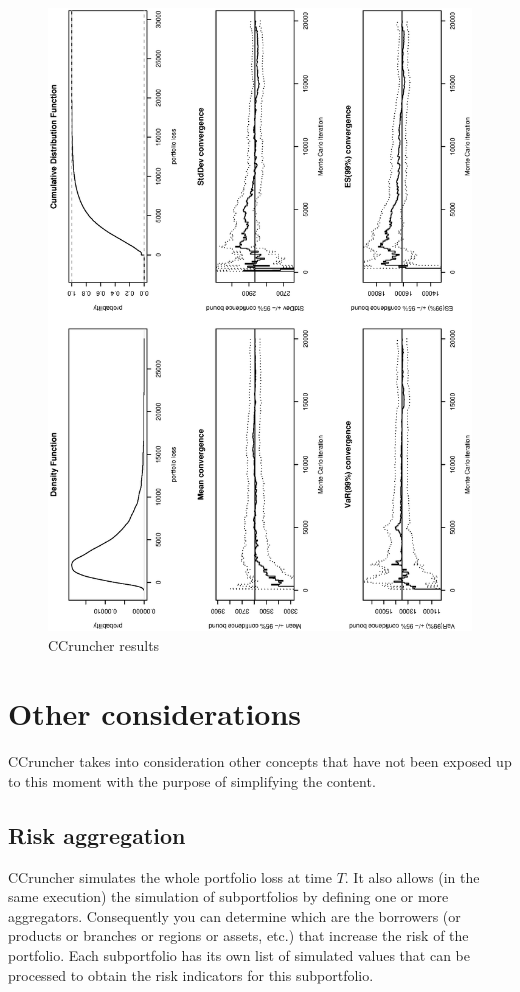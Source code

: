 \documentclass[a4paper,12pt,final]{article}
\begin{document}
\begin{figure}[p]
\begin{center}
\includegraphics[width=12cm,angle=0]{./images/report.eps}
\caption{CCruncher results}
\label{report}
\end{center}
\end{figure}


\clearpage
\section{Other considerations}
CCruncher takes into consideration other concepts that have not been exposed 
up to this moment with the purpose of simplifying the content.

\subsection{Risk aggregation}
CCruncher simulates the whole portfolio loss at time $T$. It also allows (in 
the same execution) the simulation of subportfolios by defining one or more 
aggregators. Consequently you can determine which are the borrowers (or products 
or branches or regions or assets, etc.) that increase the risk of the portfolio. 
Each subportfolio has its own list of simulated values that can be processed to 
obtain the risk indicators for this subportfolio.
\end{document}

